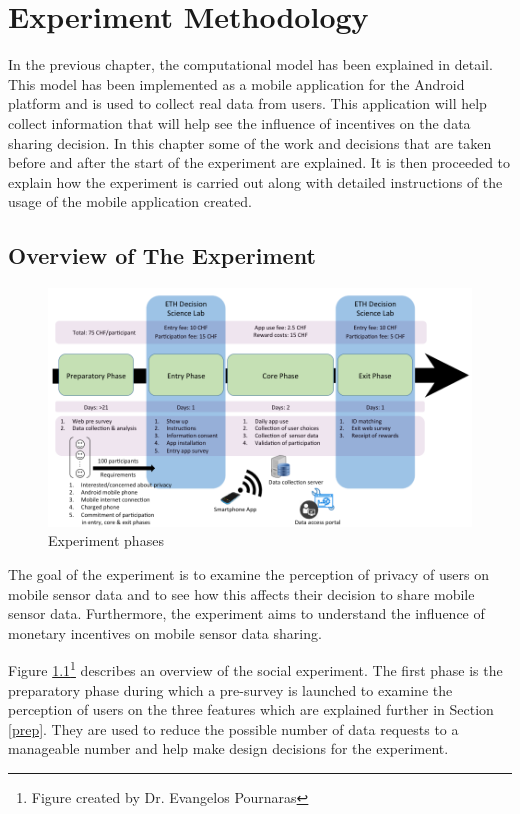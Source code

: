 \chapter{Experiment Methodology} \label{exp}

In the previous chapter, the computational model has been explained in detail. This model has been implemented as a mobile application for the Android platform and is used to collect real data from users. This application will help collect information that will help see the influence of incentives on the data sharing decision. In this chapter some of the work and decisions that are taken before and after the start of the experiment are explained. It is then proceeded to explain how the experiment is carried out along with detailed instructions of the usage of the mobile application created. 

\section{Overview of The Experiment} \label{overview}
\begin{figure}[ht!]
\centering
\includegraphics[width=\textwidth,keepaspectratio]{./images/exp_phases}
\caption{Experiment phases}
\label{fig:exp_phases}
\end{figure}

The goal of the experiment is to examine the perception of privacy of users on mobile sensor data and to see how this affects their decision to share mobile sensor data. Furthermore, the experiment aims to understand the influence of monetary incentives on mobile sensor data sharing.

Figure \ref{fig:exp_phases}\footnote{Figure created by Dr. Evangelos Pournaras} describes an overview of the social experiment. The first phase is the preparatory phase during which a pre-survey is launched to examine the perception of users on the three features which are explained further in Section \ref{prep}. They are used to reduce the possible number of data requests to a manageable number and help make design decisions for the experiment.

